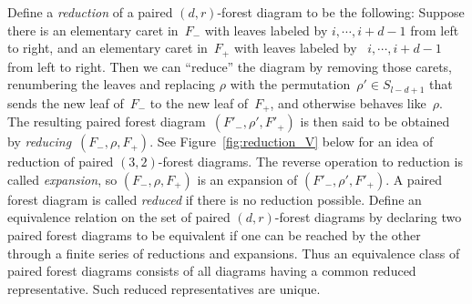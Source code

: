 \documentclass[11pt, a4paper]{amsart}
\theoremstyle{definition}
\begin{document}
Define a \emph{reduction} of a paired $(d,r)$-forest diagram to be the following: Suppose there is an
elementary caret in~$F_-$ with leaves labeled by $i,\cdots,i+d-1$ from left to right, and an elementary caret in~$F_+$ with  leaves labeled by ~$i, \cdots,i+d-1$ from left to right.  Then we can ``reduce'' the diagram
by removing those carets, renumbering the leaves and replacing
$\rho$ with the permutation~$\rho'\in S_{l-d+1}$ that sends the new leaf
of~$F_-$ to the new leaf of~$F_+$, and otherwise behaves like~$\rho$.
The resulting paired forest diagram~$(F'_-,\rho',F'_+)$ is then said to
be obtained by \emph{reducing}~$(F_-,\rho, F_+)$. See Figure~\ref{fig:reduction_V} below for an idea of reduction
of paired $(3,2)$-forest diagrams. The reverse
operation to reduction is called \emph{expansion}, so $(F_-,\rho,F_+)$
is an expansion of $(F'_-,\rho',F'_+)$.  A paired forest diagram is
called \emph{reduced} if there is no reduction possible.  Define an equivalence relation on the set of paired $(d,r)$-forest diagrams by declaring two paired  forest diagrams to be equivalent if one can be reached by the other through a finite series of reductions and expansions.
Thus an equivalence class of paired forest diagrams consists of all diagrams
having a common reduced representative.  Such reduced representatives
are unique. 
\end{document}
